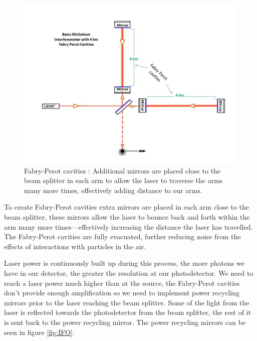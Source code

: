 \begin{figure}
   \includegraphics[width=\textwidth]{images/1_general_relativity/Basic_michelson_with_FP_labeled.jpg}
   \caption{\label{fig:FP_michelson}Fabry-Perot cavities \cite{ligo_ifo}: Additional mirrors are placed close to the beam splitter in each arm to allow the laser to traverse the arms many more times, effectively adding distance to our arms.}
\end{figure}

To create Fabry-Perot cavities extra mirrors are placed in each arm close to the beam splitter, these mirrors allow the laser to bounce back and forth within the arm many more times---effectively increasing the distance the laser has travelled. The Fabry-Perot cavities are fully evacuated, further reducing noise from the effects of interactions with particles in the air.

Laser power is continuously built up during this process, the more photons we have in our detector, the greater the resolution at our photodetector. We need to reach a laser power much higher than at the source, the Fabry-Perot
cavities don't provide enough amplification so we need to implement power recycling mirrors prior to the laser reaching the beam splitter. Some of the light from the laser is reflected towards the photodetector from the beam
splitter, the rest of it is sent back to the power recycling mirror. The power recycling mirrors can be seen in figure \ref{fig:IFO}.

